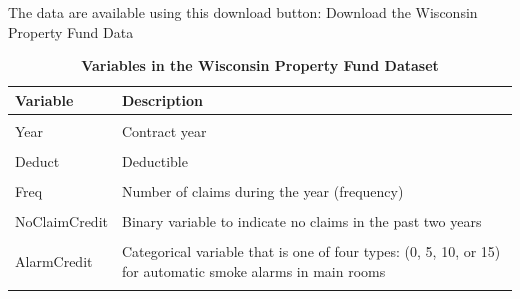 \documentclass[
  12pt,
  krantz2]{Format/krantzNoCorner}
\begin{document}
The data are available using this download button:
Download the Wisconsin Property Fund Data

\begin{table}[!h]
\centering\centering
\caption{\label{tab:unnamed-chunk-30}\textbf{Variables in the Wisconsin Property Fund Dataset}}
\centering
\fontsize{10}{12}\selectfont
\begin{tabular}[t]{>{}l>{\raggedright\arraybackslash}p{12cm}}
\toprule
Variable & Description\\
\midrule
\cellcolor{gray!10}{PolicyNum} & \cellcolor{gray!10}{Policy number}\\
Year & Contract year\\
\cellcolor{gray!10}{Premium} & \cellcolor{gray!10}{Premium}\\
Deduct & Deductible\\
\cellcolor{gray!10}{BCcov} & \cellcolor{gray!10}{Coverage for building and contents}\\
\addlinespace
Freq & Number of claims during the year (frequency)\\
\cellcolor{gray!10}{Fire5} & \cellcolor{gray!10}{Binary variable to indicate the fire class is below 5}\\
NoClaimCredit & Binary variable to indicate no claims in the past two years\\
\cellcolor{gray!10}{EntityType} & \cellcolor{gray!10}{Categorical variable that is one of six types:  1=Village, 2=City,3=County, 4=Misc, 5=School, or Town)}\\
AlarmCredit & Categorical variable that is one of four types:  (0, 5, 10, or 15) for automatic smoke alarms in main rooms\\
\addlinespace
\cellcolor{gray!10}{BCClaim} & \cellcolor{gray!10}{Builing and contents claims}\\
\bottomrule
\end{tabular}
\end{table}
\end{document}
